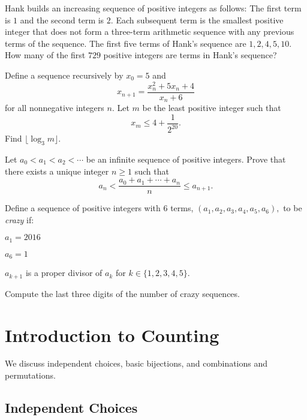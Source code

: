\documentclass[blue,onecol]{shooting}
\begin{document}
\begin{prob}{6}
Hank builds an increasing sequence of positive integers as follows: The first term is $1$ and the second term is $2.$ Each subsequent term is the smallest positive integer that does not form a three-term arithmetic sequence with any previous terms of the sequence. The first five terms of Hank's sequence are $1,2,4,5,10.$ How many of the first $729$ positive integers are terms in Hank's sequence?
\end{prob}


\begin{prob}[AMC 12B 2019/22]{9}
Define a sequence recursively by $x_0=5$ and \[x_{n+1}=\frac{x_n^2+5x_n+4}{x_n+6}\] for all nonnegative integers $n.$ Let $m$ be the least positive integer such that \[x_m\leq 4+\frac{1}{2^{20}}.\] Find $\lfloor \log_3m\rfloor.$
\end{prob}


\begin{prob}[IMO 2014/1]{13}
Let $a_0<a_1<a_2<\cdots$ be an infinite sequence of positive integers. Prove that there exists a unique integer $n\ge1$ such that
\[a_n<\frac{a_0+a_1+\cdots + a_n}{n}\le a_{n+1}.\]
\end{prob}

\begin{prob}[rd123 AIME 2020/12]{13}
Define a sequence of positive integers with $6$ terms, $(a_1,a_2,a_3,a_4,a_5,a_6),$ to be \textit{crazy} if:
	\begin{itemize}
		\Item $a_1=2016$
        
		\Item $a_6=1$
        
		\Item $a_{k+1}$ is a proper divisor of $a_k$ for $k\in \{1,2,3,4,5\}.$
	\end{itemize}
Compute the last three digits of the number of crazy sequences.
\end{prob}


\chapter{Introduction to Counting}











We discuss independent choices, basic bijections, and combinations and permutations.

\section{Independent Choices}
\end{document}

